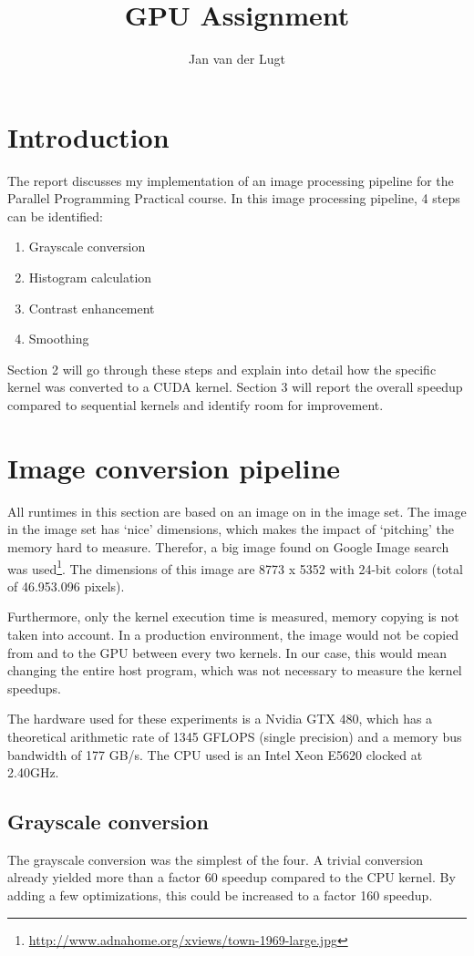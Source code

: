 \documentclass[11pt,a4paper]{article}
\title{GPU Assignment}
\author{Jan van der Lugt}
\date{}
\begin{document}
\maketitle

\section{Introduction}
The report discusses my implementation of an image processing pipeline for the Parallel Programming Practical course. In this image processing pipeline, 4 steps can be identified:
\begin{enumerate}
\item Grayscale conversion
\item Histogram calculation
\item Contrast enhancement
\item Smoothing
\end{enumerate}
Section 2 will go through these steps and explain into detail how the specific kernel was converted to a CUDA kernel. Section 3 will report the overall speedup compared to sequential kernels and identify room for improvement.

\section{Image conversion pipeline}
All runtimes in this section are based on an image on in the image set. The image in the image set has `nice' dimensions, which makes the impact of `pitching' the memory hard to measure. Therefor, a big image found on Google Image search was used\footnote{\url{http://www.adnahome.org/xviews/town-1969-large.jpg}}. The dimensions of this image are 8773 x 5352 with 24-bit colors (total of 46.953.096 pixels).

Furthermore, only the kernel execution time is measured, memory copying is not taken into account. In a production environment, the image would not be copied from and to the GPU between every two kernels. In our case, this would mean changing the entire host program, which was not necessary to measure the kernel speedups.

The hardware used for these experiments is a Nvidia GTX 480, which has a theoretical arithmetic rate of 1345 GFLOPS (single precision) and a memory bus bandwidth of 177 GB/s. The CPU used is an Intel Xeon E5620 clocked at 2.40GHz.

\subsection{Grayscale conversion}
The grayscale conversion was the simplest of the four. A trivial conversion already yielded more than a factor 60 speedup compared to the CPU kernel. By adding a few optimizations, this could be increased to a factor 160 speedup.
\end{document}
